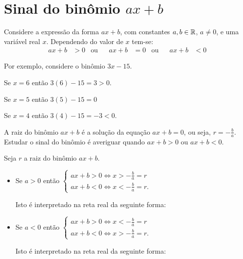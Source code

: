  \section{Sinal do binômio \texorpdfstring{$ax+b$}{ax+b}}

Considere a expressão da forma $ax+b$, com constantes $a,b\in\mathbb{R}$, $a\neq 0$, e uma variável real $x$. Dependendo do valor de $x$ tem-se:
\begin{align*}
    ax+b&>0 & \mbox{ou} && ax+b&=0 & \mbox{ou} && ax+b&<0
\end{align*}

Por exemplo, considere o binômio $3x-15$.

Se $x=6$ então $3(6)-15=3>0$.

Se $x=5$ então $3(5)-15=0$

Se $x=4$ então $3(4)-15=-3<0$.

A raiz do binômio $ax+b$ é a solução da equação $ax+b=0$, ou seja, $r=-\frac{b}{a}$. Estudar o sinal do binômio é averiguar quando $ax+b>0$ ou $ax+b<0$.

\begin{obs}
    Seja $r$ a raiz do binômio $ax+b$.
    \begin{itemize}
        \item Se $a>0$ então 
    $%
        \left\{
        \begin{matrix}
            ax+b>0 \Leftrightarrow x>-\frac{b}{a}=r\\
            ax+b<0 \Leftrightarrow x<-\frac{b}{a}=r.
        \end{matrix}
        \right.
    $%
    
    Isto é interpretado na reta real da seguinte forma:
    \begin{signtbl}{1}{1}
    \end{signtbl}   

    \item Se $a<0$ então
    $
        \left\{
        \begin{matrix}
            ax+b>0 \Leftrightarrow x<-\frac{b}{a}=r\\
            ax+b<0 \Leftrightarrow x>-\frac{b}{a}=r.
        \end{matrix}
        \right.
    $

    Isto é interpretado na reta real da seguinte forma:
    \begin{signtbl}{1}{1}
    \end{signtbl} 
    \end{itemize}
\end{obs}


